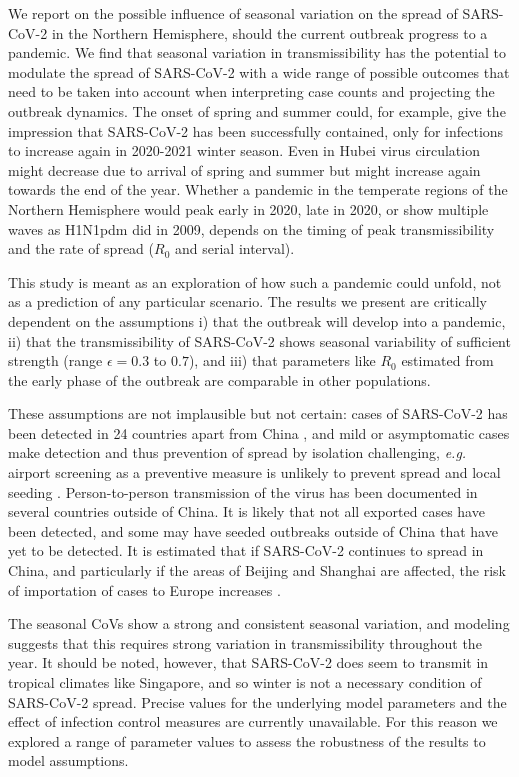 \documentclass[rmp, reprint, superscriptaddress, floatfix,amsmath]{revtex4-1}
\begin{document}
We report on the possible influence of seasonal variation on the spread of SARS-CoV-2 in the Northern Hemisphere, should the current outbreak progress to a pandemic. We find that seasonal variation in transmissibility has the potential to modulate the spread of SARS-CoV-2 with a wide range of possible outcomes that need to be taken into account when interpreting case counts and projecting the outbreak dynamics. 
The onset of spring and summer could, for example, give the impression that SARS-CoV-2 has been successfully contained, only for infections to increase again in 2020-2021 winter season. 
Even in Hubei virus circulation might decrease due to arrival of spring and summer but might increase again towards the end of the year.
Whether a pandemic in the temperate regions of the Northern Hemisphere would peak early in 2020, late in 2020, or show multiple waves as H1N1pdm did in 2009, depends on the timing of peak transmissibility and the rate of spread ($R_0$ and serial interval).

This study is meant as an exploration of how such a pandemic could unfold, not as a prediction of any particular scenario.
The results we present are critically dependent on the assumptions
i) that the outbreak will develop into a pandemic,
ii) that the transmissibility of SARS-CoV-2 shows seasonal variability of sufficient strength (range $\epsilon=0.3$ to $0.7$), and  
iii) that parameters like $R_0$ estimated from the early phase of the outbreak are comparable in other populations. 

These assumptions are not implausible but not certain: cases of SARS-CoV-2 has been detected in 24 countries apart from China \citep{WHO_situation_report23}, and mild or asymptomatic cases make detection and thus prevention of spread by isolation challenging, \textit{e.g.} airport screening as a preventive measure is unlikely to prevent spread and local seeding \citep{quilty2020effectiveness}. 
Person-to-person transmission of the virus has been documented in several countries outside of China. 
It is likely that not all exported cases have been detected, and some may have seeded outbreaks outside of China that have yet to be detected. It is estimated that if SARS-CoV-2 continues to spread in China, and particularly if the areas of Beijing and Shanghai are affected, the risk of importation of cases to Europe increases \citep{pullano2020novel}.

The seasonal CoVs show a strong and consistent seasonal variation, and modeling suggests that this requires strong variation in transmissibility throughout the year.
It should be noted, however, that SARS-CoV-2 does seem to transmit in tropical climates like Singapore, and so winter is not a necessary condition of SARS-CoV-2 spread. 
Precise values for the underlying model parameters and the effect of infection control measures are currently unavailable. For this reason we explored a range of parameter values to assess the robustness of the results to model assumptions.
\end{document}
